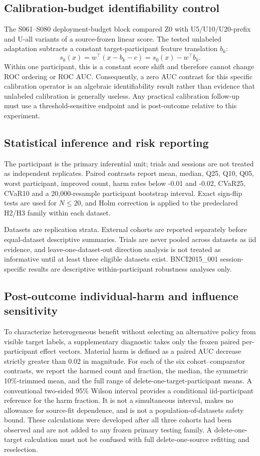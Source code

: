 \subsection{Calibration-budget identifiability control}
The S061--S080 deployment-budget block compared Z0 with U5/U10/U20-prefix
and U-all variants of a source-frozen linear score. The tested unlabeled
adaptation subtracts a constant target-participant feature translation
\(b_k\):
\[
 s_k(x)=w^\top(x-b_k-c)=s_0(x)-w^\top b_k.
\]
Within one participant, this is a constant score shift and therefore cannot
change ROC ordering or ROC AUC. Consequently, a zero AUC contrast for this
specific calibration operator is an algebraic identifiability result rather
than evidence that unlabeled calibration is generally useless. Any practical
calibration follow-up must use a threshold-sensitive endpoint and is
post-outcome relative to this experiment.

\subsection{Statistical inference and risk reporting}
The participant is the primary inferential unit; trials and sessions are not
treated as independent replicates. Paired contrasts report mean, median, Q25,
Q10, Q05, worst participant, improved count, harm rates below -0.01 and
-0.02, CVaR25, CVaR10 and a 20,000-resample participant bootstrap interval.
Exact sign-flip tests are used for \(N\le20\), and Holm correction is
applied to the predeclared H2/H3 family within each dataset.

Datasets are replication strata. External cohorts are reported separately
before equal-dataset descriptive summaries. Trials are never pooled across
datasets as iid evidence, and leave-one-dataset-out direction analysis is not
treated as informative until at least three eligible datasets exist.
BNCI2015\_001 session-specific results are descriptive within-participant
robustness analyses only.

\subsection{Post-outcome individual-harm and influence sensitivity}
To characterize heterogeneous benefit without selecting an alternative
policy from visible target labels, a supplementary diagnostic takes only
the frozen paired per-participant effect vectors. Material harm is defined
as a paired AUC decrease strictly greater than 0.02 in magnitude. For each
of the six cohort--comparator contrasts, we report the harmed count and
fraction, the median, the symmetric 10\%-trimmed mean, and the full range
of delete-one-target-participant means. A conventional two-sided 95\%
Wilson interval provides a conditional iid-participant reference for the
harm fraction. It is not a simultaneous interval, makes no allowance for
source-fit dependence, and is not a population-of-datasets safety bound.
These calculations were developed after all three cohorts had been
observed and are not added to any frozen primary testing family. A
delete-one-target calculation must not be confused with full
delete-one-source refitting and reselection.

